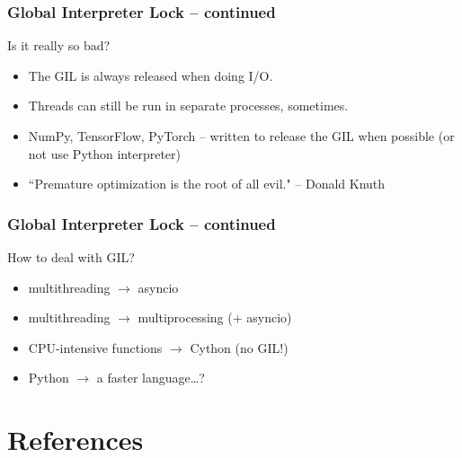 \documentclass{beamer}
\begin{document}
    \begin{frame}
        \frametitle{Global Interpreter Lock -- continued}
        Is it really so bad?

        \begin{itemize}
            \item The GIL is always released when doing I/O.
            \item Threads can still be run in separate processes, sometimes.
            \item NumPy, TensorFlow, PyTorch -- written to release the GIL when possible (or not use Python interpreter)
            \item ``Premature optimization is the root of all evil." -- Donald Knuth

        \end{itemize}


    \end{frame}

    \begin{frame}
        \frametitle{Global Interpreter Lock -- continued}

        How to deal with GIL?
        \begin{itemize}
            \item multithreading $\rightarrow$ asyncio
            \item multithreading $\rightarrow$ multiprocessing (+ asyncio)
            \item CPU-intensive functions $\rightarrow$ Cython (no GIL!)
            \item Python $\rightarrow$ a faster language\dots?
        \end{itemize}

    \end{frame}


    \section{References}
\end{document}
